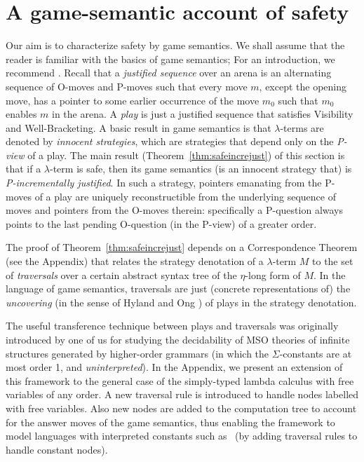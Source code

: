
\section{A game-semantic account of safety}
\label{sec:gamesemaccount} Our aim is to characterize safety by game
semantics. We shall assume that the reader is familiar with the
basics of game semantics; For an introduction, we recommend
\cite{abramsky:game-semantics-tutorial}. Recall that a
\emph{justified sequence} over an arena is an alternating sequence
of O-moves and P-moves such that every move $m$, except the opening
move, has a pointer to some earlier occurrence of the move $m_0$
such that $m_0$ enables $m$ in the arena. A \emph{play} is just a
justified sequence that satisfies Visibility and Well-Bracketing. A
basic result in game semantics is that $\lambda$-terms are denoted
by \emph{innocent strategies}, which are strategies that depend only
on the \emph{P-view} of a play. The main result
(Theorem~\ref{thm:safeincrejust}) of this section is that if a
$\lambda$-term is safe, then its game semantics (is an innocent
strategy that) is \emph{P-incrementally justified}. In such a
strategy, pointers emanating from the P-moves of a play are uniquely
reconstructible from the underlying sequence of moves and pointers
from the O-moves therein: specifically a P-question always points to
the last pending O-question (in the P-view) of a greater order.

The proof of Theorem~\ref{thm:safeincrejust} depends on a
Correspondence Theorem (see the Appendix) that relates the strategy
denotation of a $\lambda$-term $M$ to the set of \emph{traversals}
over a certain abstract syntax tree of the $\eta$-long form of $M$.
In the language of game semantics, traversals are just (concrete
representations of) the \emph{uncovering} (in the sense of Hyland
and Ong \cite{hylandong_pcf}) of plays in the strategy denotation.

The useful transference technique between plays and traversals was
originally introduced by one of us \cite{OngLics2006} for studying
the decidability of MSO theories of infinite structures generated by
higher-order grammars (in which the $\Sigma$-constants are at most
order 1, and \emph{uninterpreted}).
In the Appendix, we present an extension of this framework to the
general case of the simply-typed lambda calculus with free variables
of any order. A new traversal rule is introduced to handle nodes
labelled with free variables. Also new nodes are added to the
computation tree to account for the answer moves of the game
semantics, thus enabling the framework to model languages with
interpreted constants such as \pcf~(by adding traversal rules to
handle constant nodes).

